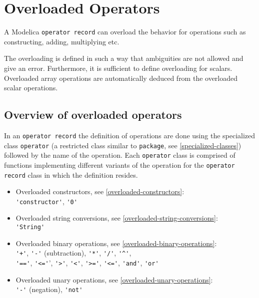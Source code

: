 \chapter{Overloaded Operators}\label{overloaded-operators}

A Modelica \lstinline!operator record! can overload the behavior for
operations such as constructing, adding, multiplying etc.

The overloading is defined in such a way that ambiguities are not allowed and give an error.
Furthermore, it is sufficient to define overloading for scalars.
Overloaded array operations are automatically deduced from the overloaded scalar operations.

\section{Overview of overloaded operators}\label{overview-of-overloaded-operators}
In an \lstinline!operator record! the definition of operations are done using the specialized class \lstinline!operator!
(a restricted class similar to \lstinline!package!, see \cref{specialized-classes})
followed by the name of the operation. Each \lstinline!operator! class is
comprised of functions
implementing different variants of the operation for the \lstinline!operator record! class in
which the definition resides.
%
\begin{itemize}
\item Overloaded constructors, see \cref{overloaded-constructors}:\\ \lstinline!'constructor'!, \lstinline!'0'!
\item Overloaded string conversions, see \cref{overloaded-string-conversions}:\\ \lstinline!'String'!
\item Overloaded binary operations, see \cref{overloaded-binary-operations}:\\
\lstinline!'+'!, \lstinline!'-'! (subtraction), \lstinline!'*'!, \lstinline!'/'!, \lstinline!'^'!,\\
 \lstinline!'=='!, \lstinline!'<='!', \lstinline!'>'!, \lstinline!'<'!,
\lstinline!'>='!, \lstinline!'<='!, \lstinline!'and'!, \lstinline!'or'!
\item Overloaded unary operations, see \cref{overloaded-unary-operations}:\\
\lstinline!'-'! (negation), \lstinline!'not'!
\end{itemize}

